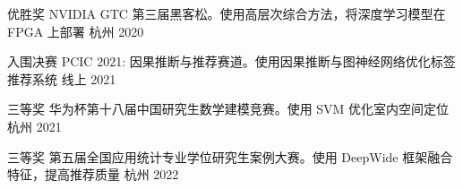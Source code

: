 


\begin{cvhonors}
\cvhonor
  {优胜奖} %
  {NVIDIA GTC 第三届黑客松。使用高层次综合方法，将深度学习模型在 FPGA 上部署} %
  {杭州} %
  {2020} %

\cvhonor
  {入围决赛} %
  {PCIC 2021: 因果推断与推荐赛道。使用因果推断与图神经网络优化标签推荐系统} %
  {线上} %
  {2021} %

\cvhonor
  {三等奖} %
  {华为杯第十八届中国研究生数学建模竞赛。使用 SVM 优化室内空间定位} %
  {杭州} %
  {2021} %


\cvhonor
  {三等奖} %
  {第五届全国应用统计专业学位研究生案例大赛。使用 DeepWide 框架融合特征，提高推荐质量} %
  {杭州} %
  {2022} %

\end{cvhonors}

